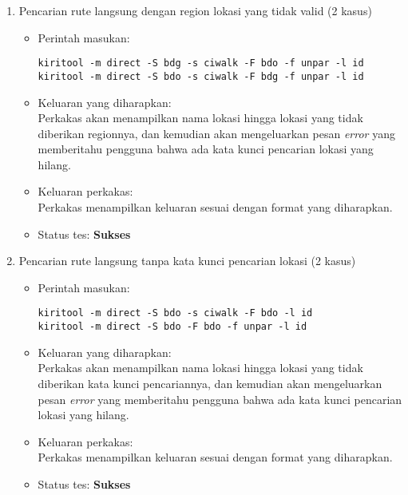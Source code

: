 \begin{enumerate}
	\item Pencarian rute langsung dengan region lokasi yang tidak valid (2 kasus)
	\begin{itemize}
		\item Perintah masukan:
		\begin{verbatim}
kiritool -m direct -S bdg -s ciwalk -F bdo -f unpar -l id
kiritool -m direct -S bdo -s ciwalk -F bdg -f unpar -l id
		\end{verbatim}
		\item Keluaran yang diharapkan: \\
		Perkakas akan menampilkan nama lokasi hingga lokasi yang tidak diberikan regionnya, dan kemudian akan mengeluarkan pesan \textit{error} yang memberitahu pengguna bahwa ada kata kunci pencarian lokasi yang hilang.
		\item Keluaran perkakas: \\
		Perkakas menampilkan keluaran sesuai dengan format yang diharapkan.
		\item Status tes: \textbf{Sukses}
	\end{itemize}
	
	\item Pencarian rute langsung tanpa kata kunci pencarian lokasi (2 kasus)
	\begin{itemize}
		\item Perintah masukan:
		\begin{verbatim}
kiritool -m direct -S bdo -s ciwalk -F bdo -l id
kiritool -m direct -S bdo -F bdo -f unpar -l id
		\end{verbatim}
		\item Keluaran yang diharapkan: \\
		Perkakas akan menampilkan nama lokasi hingga lokasi yang tidak diberikan kata kunci pencariannya, dan kemudian akan mengeluarkan pesan \textit{error} yang memberitahu pengguna bahwa ada kata kunci pencarian lokasi yang hilang.
		\item Keluaran perkakas: \\
		Perkakas menampilkan keluaran sesuai dengan format yang diharapkan.
		\item Status tes: \textbf{Sukses}
	\end{itemize}
	

\end{enumerate}
